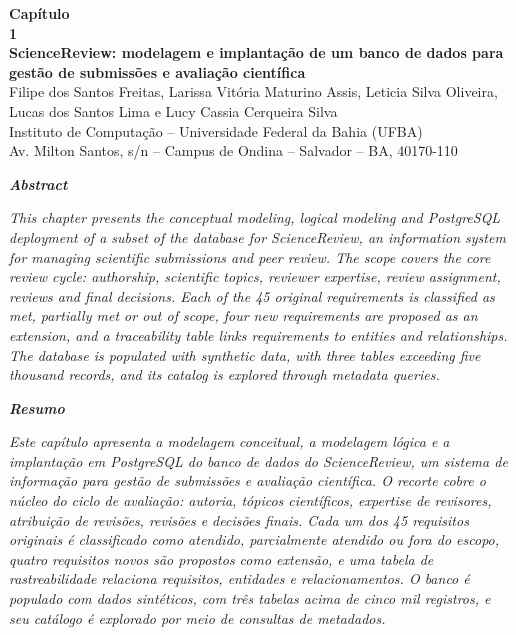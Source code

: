 \documentclass[12pt,a4paper]{article}
\begin{document}
\thispagestyle{empty}

\begin{flushleft}
{\fontsize{20}{24}\selectfont\bfseries Capítulo}\\[4pt]
{\fontsize{48}{52}\selectfont\bfseries 1}\\[1.4cm]
{\fontsize{20}{24}\selectfont\bfseries ScienceReview: modelagem e implantação de um banco de dados para gestão de submissões e avaliação científica}\\[1cm]
{\large Filipe dos Santos Freitas, Larissa Vitória Maturino Assis, Leticia Silva Oliveira, Lucas dos Santos Lima e Lucy Cassia Cerqueira Silva}\\[4pt]
{\normalsize Instituto de Computação -- Universidade Federal da Bahia (UFBA)\\
Av. Milton Santos, s/n -- Campus de Ondina -- Salvador -- BA, 40170-110}
\end{flushleft}

\vspace{1cm}

\begin{center}\textbf{\textit{Abstract}}\end{center}
\vspace{-6pt}
{\leftskip=0.8cm\rightskip=0.8cm\noindent\itshape
This chapter presents the conceptual modeling, logical modeling and PostgreSQL
deployment of a subset of the database for ScienceReview, an information system for managing
scientific submissions and peer review. The scope covers the core review cycle:
authorship, scientific topics, reviewer expertise, review assignment, reviews and
final decisions. Each of the 45 original requirements is classified as met, partially
met or out of scope, four new requirements are proposed as an extension, and a
traceability table links requirements to entities and relationships. The database is
populated with synthetic data, with three tables exceeding five thousand records, and its
catalog is explored through metadata queries.\par}

\begin{center}\textbf{\textit{Resumo}}\end{center}
\vspace{-6pt}
{\leftskip=0.8cm\rightskip=0.8cm\noindent\itshape
Este capítulo apresenta a modelagem conceitual, a modelagem lógica e a implantação
em PostgreSQL do banco de dados do ScienceReview, um sistema de informação para
gestão de submissões e avaliação científica. O recorte cobre o núcleo do ciclo de
avaliação: autoria, tópicos científicos, expertise de revisores, atribuição de
revisões, revisões e decisões finais. Cada um dos 45 requisitos originais é
classificado como atendido, parcialmente atendido ou fora do escopo, quatro
requisitos novos são propostos como extensão, e uma tabela de rastreabilidade
relaciona requisitos, entidades e relacionamentos. O banco é populado com dados
sintéticos, com três tabelas acima de cinco mil registros, e seu catálogo é explorado
por meio de consultas de metadados.\par}
\end{document}
